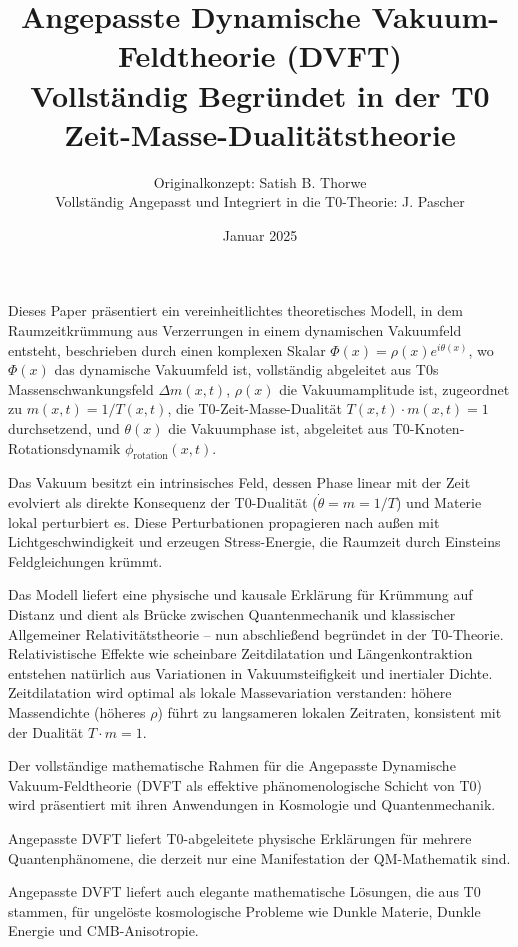 \documentclass[12pt,a4paper]{article}
\title{Angepasste Dynamische Vakuum-Feldtheorie (DVFT)\\ 
	Vollständig Begründet in der T0 Zeit-Masse-Dualitätstheorie}
\author{Originalkonzept: Satish B. Thorwe\\
	Vollständig Angepasst und Integriert in die T0-Theorie: J. Pascher}
\date{Januar 2025}
\begin{document}
	
	\maketitle
	
	\tableofcontents
	
	\newpage
	
	\begin{t0box}[Zusammenfassung]
		Dieses Paper präsentiert ein vereinheitlichtes theoretisches Modell, in dem Raumzeitkrümmung aus Verzerrungen in einem dynamischen Vakuumfeld entsteht, beschrieben durch einen komplexen Skalar $\Phi(x)=\rho(x)e^{i\theta(x)}$, wo $\Phi(x)$ das dynamische Vakuumfeld ist, vollständig abgeleitet aus T0s Massenschwankungsfeld $\Delta m(x,t)$, $\rho(x)$ die Vakuumamplitude ist, zugeordnet zu $m(x,t) = 1/T(x,t)$, die T0-Zeit-Masse-Dualität $T(x,t) \cdot m(x,t) = 1$ durchsetzend, und $\theta(x)$ die Vakuumphase ist, abgeleitet aus T0-Knoten-Rotationsdynamik $\phi_{\text{rotation}}(x,t)$.
		
		Das Vakuum besitzt ein intrinsisches Feld, dessen Phase linear mit der Zeit evolviert als direkte Konsequenz der T0-Dualität ($\dot{\theta} = m = 1/T$) und Materie lokal perturbiert es. Diese Perturbationen propagieren nach außen mit Lichtgeschwindigkeit und erzeugen Stress-Energie, die Raumzeit durch Einsteins Feldgleichungen krümmt.
		
		Das Modell liefert eine physische und kausale Erklärung für Krümmung auf Distanz und dient als Brücke zwischen Quantenmechanik und klassischer Allgemeiner Relativitätstheorie – nun abschließend begründet in der T0-Theorie. Relativistische Effekte wie scheinbare Zeitdilatation und Längenkontraktion entstehen natürlich aus Variationen in Vakuumsteifigkeit und inertialer Dichte. Zeitdilatation wird optimal als lokale Massevariation verstanden: höhere Massendichte (höheres $\rho$) führt zu langsameren lokalen Zeitraten, konsistent mit der Dualität $T \cdot m = 1$.
		
		Der vollständige mathematische Rahmen für die Angepasste Dynamische Vakuum-Feldtheorie (DVFT als effektive phänomenologische Schicht von T0) wird präsentiert mit ihren Anwendungen in Kosmologie und Quantenmechanik.
		
		Angepasste DVFT liefert T0-abgeleitete physische Erklärungen für mehrere Quantenphänomene, die derzeit nur eine Manifestation der QM-Mathematik sind.
		
		Angepasste DVFT liefert auch elegante mathematische Lösungen, die aus T0 stammen, für ungelöste kosmologische Probleme wie Dunkle Materie, Dunkle Energie und CMB-Anisotropie.
	\end{t0box}
	
\end{document}
